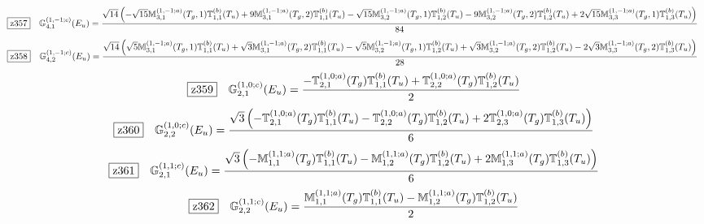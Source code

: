 \documentclass[fleqn,10pt,landscape]{jsarticle}
\begin{document}
\begin{dmath*}
\hspace*{3mm}\fbox{z357}\quad \mathbb{G}_{4,1}^{(1,-1;c)}(E_{u})=\frac{\sqrt{14} \left(- \sqrt{15} \mathbb{M}_{3,1}^{(1,-1;a)}(T_{g},1) \mathbb{T}_{1,1}^{(b)}(T_{u}) + 9 \mathbb{M}_{3,1}^{(1,-1;a)}(T_{g},2) \mathbb{T}_{1,1}^{(b)}(T_{u}) - \sqrt{15} \mathbb{M}_{3,2}^{(1,-1;a)}(T_{g},1) \mathbb{T}_{1,2}^{(b)}(T_{u}) - 9 \mathbb{M}_{3,2}^{(1,-1;a)}(T_{g},2) \mathbb{T}_{1,2}^{(b)}(T_{u}) + 2 \sqrt{15} \mathbb{M}_{3,3}^{(1,-1;a)}(T_{g},1) \mathbb{T}_{1,3}^{(b)}(T_{u})\right)}{84}
\end{dmath*}
\begin{dmath*}
\hspace*{3mm}\fbox{z358}\quad \mathbb{G}_{4,2}^{(1,-1;c)}(E_{u})=\frac{\sqrt{14} \left(\sqrt{5} \mathbb{M}_{3,1}^{(1,-1;a)}(T_{g},1) \mathbb{T}_{1,1}^{(b)}(T_{u}) + \sqrt{3} \mathbb{M}_{3,1}^{(1,-1;a)}(T_{g},2) \mathbb{T}_{1,1}^{(b)}(T_{u}) - \sqrt{5} \mathbb{M}_{3,2}^{(1,-1;a)}(T_{g},1) \mathbb{T}_{1,2}^{(b)}(T_{u}) + \sqrt{3} \mathbb{M}_{3,2}^{(1,-1;a)}(T_{g},2) \mathbb{T}_{1,2}^{(b)}(T_{u}) - 2 \sqrt{3} \mathbb{M}_{3,3}^{(1,-1;a)}(T_{g},2) \mathbb{T}_{1,3}^{(b)}(T_{u})\right)}{28}
\end{dmath*}
\begin{dmath*}
\hspace*{3mm}\fbox{z359}\quad \mathbb{G}_{2,1}^{(1,0;c)}(E_{u})=\frac{- \mathbb{T}_{2,1}^{(1,0;a)}(T_{g}) \mathbb{T}_{1,1}^{(b)}(T_{u}) + \mathbb{T}_{2,2}^{(1,0;a)}(T_{g}) \mathbb{T}_{1,2}^{(b)}(T_{u})}{2}
\end{dmath*}
\begin{dmath*}
\hspace*{3mm}\fbox{z360}\quad \mathbb{G}_{2,2}^{(1,0;c)}(E_{u})=\frac{\sqrt{3} \left(- \mathbb{T}_{2,1}^{(1,0;a)}(T_{g}) \mathbb{T}_{1,1}^{(b)}(T_{u}) - \mathbb{T}_{2,2}^{(1,0;a)}(T_{g}) \mathbb{T}_{1,2}^{(b)}(T_{u}) + 2 \mathbb{T}_{2,3}^{(1,0;a)}(T_{g}) \mathbb{T}_{1,3}^{(b)}(T_{u})\right)}{6}
\end{dmath*}
\begin{dmath*}
\hspace*{3mm}\fbox{z361}\quad \mathbb{G}_{2,1}^{(1,1;c)}(E_{u})=\frac{\sqrt{3} \left(- \mathbb{M}_{1,1}^{(1,1;a)}(T_{g}) \mathbb{T}_{1,1}^{(b)}(T_{u}) - \mathbb{M}_{1,2}^{(1,1;a)}(T_{g}) \mathbb{T}_{1,2}^{(b)}(T_{u}) + 2 \mathbb{M}_{1,3}^{(1,1;a)}(T_{g}) \mathbb{T}_{1,3}^{(b)}(T_{u})\right)}{6}
\end{dmath*}
\begin{dmath*}
\hspace*{3mm}\fbox{z362}\quad \mathbb{G}_{2,2}^{(1,1;c)}(E_{u})=\frac{\mathbb{M}_{1,1}^{(1,1;a)}(T_{g}) \mathbb{T}_{1,1}^{(b)}(T_{u}) - \mathbb{M}_{1,2}^{(1,1;a)}(T_{g}) \mathbb{T}_{1,2}^{(b)}(T_{u})}{2}
\end{dmath*}
\end{document}
